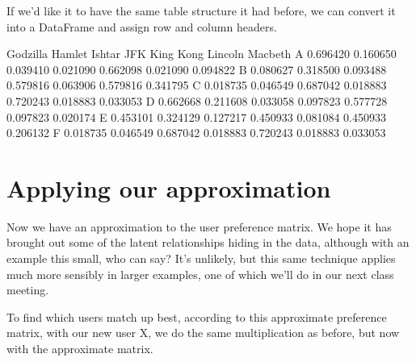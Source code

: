 \documentclass[letterpaper,10pt,english]{jupyterBook}
\begin{document}
\sphinxAtStartPar
If we’d like it to have the same table structure it had before, we can convert it into a DataFrame and assign row and column headers.

\begin{sphinxVerbatim}[commandchars=\\\{\}]
    
  
  
\end{sphinxVerbatim}

\begin{sphinxVerbatim}[commandchars=\\\{\}]
   Godzilla    Hamlet    Ishtar       JFK  King Kong   Lincoln   Macbeth
A  0.696420  0.160650  0.039410 \PYGZhy{}0.021090   0.662098 \PYGZhy{}0.021090 \PYGZhy{}0.094822
B  0.080627  0.318500  0.093488  0.579816  \PYGZhy{}0.063906  0.579816  0.341795
C \PYGZhy{}0.018735  0.046549  0.687042 \PYGZhy{}0.018883   0.720243 \PYGZhy{}0.018883  0.033053
D  0.662668  0.211608  0.033058  0.097823   0.577728  0.097823 \PYGZhy{}0.020174
E  0.453101  0.324129 \PYGZhy{}0.127217  0.450933   0.081084  0.450933  0.206132
F \PYGZhy{}0.018735  0.046549  0.687042 \PYGZhy{}0.018883   0.720243 \PYGZhy{}0.018883  0.033053
\end{sphinxVerbatim}


\section{Applying our approximation}
\label{\detokenize{chapter-16-matrices:applying-our-approximation}}
\sphinxAtStartPar
Now we have an approximation to the user preference matrix.  We hope it has brought out some of the latent relationships hiding in the data, although with an example this small, who can say?  It’s unlikely, but this same technique applies much more sensibly in larger examples, one of which we’ll do in our next class meeting.

\sphinxAtStartPar
To find which users match up best, according to this approximate preference matrix, with our new user X, we do the same multiplication as before, but now with the approximate matrix.

\begin{sphinxVerbatim}[commandchars=\\\{\}]
  
\end{sphinxVerbatim}
\end{document}
